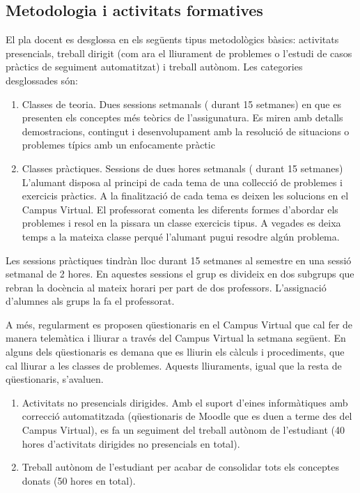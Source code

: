 \documentclass[
  catalan,
]{article}
\theoremstyle{definition}
\theoremstyle{definition}
\theoremstyle{definition}
\theoremstyle{definition}
\theoremstyle{remark}
\begin{document}
\subsection*{Metodologia i activitats formatives}\label{metodologia-i-activitats-formatives}

El pla docent es desglossa en els següents tipus metodològics bàsics: activitats presencials, treball dirigit (com ara el lliurament de problemes o l'estudi de casos pràctics de seguiment automatitzat) i treball autònom. Les categories desglossades són:

\begin{enumerate}
\def\labelenumi{\arabic{enumi}.}
\item
  Classes de teoria. Dues sessions setmanals ( durant 15 setmanes) en que es presenten els conceptes més teòrics de l'assigunatura. Es miren amb detalls demostracions, contingut i desenvolupament amb la resolució de situacions o problemes típics amb un enfocamente pràctic
\item
  Classes pràctiques. Sessions de dues hores setmanals ( durant 15 setmanes) L'alumant disposa al principi de cada tema de una collecció de problemes i exercicis pràctics. A la finalització de cada tema es deixen les solucions en el Campus Virtual. El professorat comenta les diferents formes d'abordar els problemes i resol en la pissara un classe exercicis tipus. A vegades es deixa temps a la mateixa classe perqué l'alumant pugui resodre algún problema.
\end{enumerate}

Les sessions pràctiques tindràn lloc durant 15 setmanes al semestre en una sessió setmanal de 2 hores. En aquestes sessions el grup es divideix en dos subgrups que rebran la docència al mateix horari per part de dos professors. L'assignació d'alumnes als grups la fa el professorat.

A més, regularment es proposen qüestionaris en el Campus Virtual que cal fer de manera telemàtica i lliurar a través del Campus Virtual la setmana següent. En alguns dels qüestionaris es demana que es lliurin els càlculs i procediments, que cal lliurar a les classes de problemes. Aquests lliuraments, igual que la resta de qüestionaris, s'avaluen.

\begin{enumerate}
\def\labelenumi{\arabic{enumi}.}
\setcounter{enumi}{2}
\item
  Activitats no presencials dirigides. Amb el suport d'eines informàtiques amb correcció automatitzada (qüestionaris de Moodle que es duen a terme des del Campus Virtual), es fa un seguiment del treball autònom de l'estudiant (40 hores d'activitats dirigides no presencials en total).
\item
  Treball autònom de l'estudiant per acabar de consolidar tots els conceptes donats (50 hores en total).
\end{enumerate}
\end{document}
